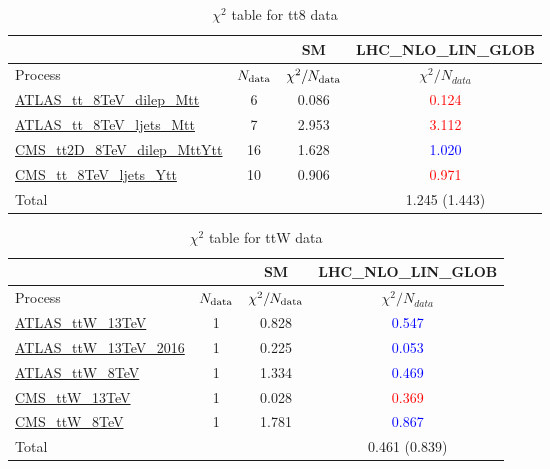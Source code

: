 \documentclass{article}
\begin{document}
\begin{table}[H]
\centering
\begin{tabular}{|l|c|c|c|}
\hline
 \multicolumn{2}{|c|}{} & SM& LHC_NLO_LIN_GLOB\\ \hline
Process & $N_{\rm data}$ & $\chi^ 2/N_{\rm data}$& $\chi^ 2/N_{data}$\\ \hline
\href{https://arxiv.org}{ATLAS_tt_8TeV_dilep_Mtt} & 6 & 0.086 & \textcolor{red}                            {0.124} \\ \hline
\href{https://arxiv.org}{ATLAS_tt_8TeV_ljets_Mtt} & 7 & 2.953 & \textcolor{red}                            {3.112} \\ \hline
\href{https://arxiv.org}{CMS_tt2D_8TeV_dilep_MttYtt} & 16 & 1.628 & \textcolor{blue}                            {1.020} \\ \hline
\href{https://arxiv.org}{CMS_tt_8TeV_ljets_Ytt} & 10 & 0.906 & \textcolor{red}                            {0.971} \\ \hline
\hline Total & &  & 1.245 (1.443) \\ \hline
\end{tabular}
\caption{$\chi^2$ table for tt8 data}
\end{table}
\begin{table}[H]
\centering
\begin{tabular}{|l|c|c|c|}
\hline
 \multicolumn{2}{|c|}{} & SM& LHC_NLO_LIN_GLOB\\ \hline
Process & $N_{\rm data}$ & $\chi^ 2/N_{\rm data}$& $\chi^ 2/N_{data}$\\ \hline
\href{https://arxiv.org}{ATLAS_ttW_13TeV} & 1 & 0.828 & \textcolor{blue}                            {0.547} \\ \hline
\href{https://arxiv.org}{ATLAS_ttW_13TeV_2016} & 1 & 0.225 & \textcolor{blue}                            {0.053} \\ \hline
\href{https://arxiv.org}{ATLAS_ttW_8TeV} & 1 & 1.334 & \textcolor{blue}                            {0.469} \\ \hline
\href{https://arxiv.org}{CMS_ttW_13TeV} & 1 & 0.028 & \textcolor{red}                            {0.369} \\ \hline
\href{https://arxiv.org}{CMS_ttW_8TeV} & 1 & 1.781 & \textcolor{blue}                            {0.867} \\ \hline
\hline Total & &  & 0.461 (0.839) \\ \hline
\end{tabular}
\caption{$\chi^2$ table for ttW data}
\end{table}
\end{document}

